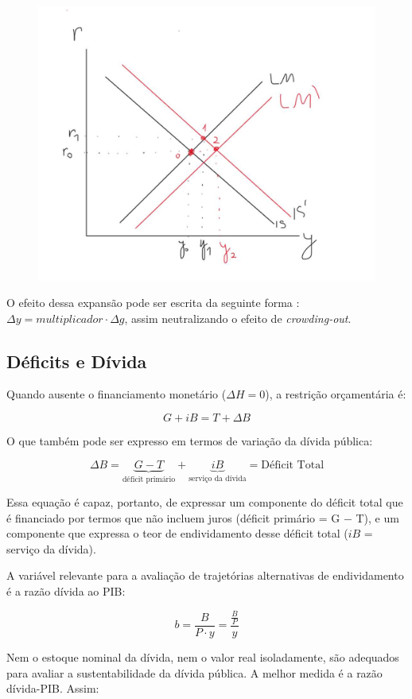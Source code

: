\documentclass[a4paper,12pt]{article}[abntex2]
\begin{document}
\begin{figure}[H]
    \centering
    \includegraphics[width=0.7\linewidth]{Imagens/a18i3.png}
\end{figure}

O efeito dessa expansão pode ser escrita da seguinte forma : \(\Delta y=multiplicador \cdot \Delta g\), assim neutralizando o efeito de \textit{crowding-out}.

\subsection{\textbf{Déficits e Dívida}}

Quando ausente o financiamento monetário ($\Delta H = 0$), a restrição orçamentária é:

\[
G + iB = T + \Delta B
\]

O que também pode ser expresso em termos de variação da dívida pública:

\[
\Delta B = \underbrace{G - T}_\text{déficit primário} + \underbrace{iB}_\text{serviço da dívida} = \text{Déficit Total}
\]

Essa equação é capaz, portanto, de expressar um componente do déficit total que é financiado por termos que não incluem juros (déficit primário = G − T), e um componente que expressa o teor de endividamento desse déficit total (\(iB\) = serviço da dívida). 

A variável relevante para a avaliação de trajetórias alternativas de endividamento é a razão dívida ao PIB:  

\[
b = \frac{B}{P \cdot y} = \frac{\frac{B}{P}}{y}
\]

Nem o estoque nominal da dívida, nem o valor real isoladamente, são adequados para avaliar a sustentabilidade da dívida pública. A melhor medida é a razão dívida-PIB. Assim:
\end{document}

